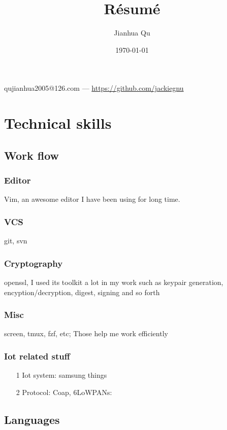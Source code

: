 \documentclass{article}
\makeatletter
\renewcommand{\maketitle}{
\begin{center}

{\huge\bfseries\theauthor}

\vspace{.25em}
qujianhua2005@126.com --- \url {https://github.com/jackiegnu}

\vspace{.25em}
\thedate

\end{center}
}
\makeatother
\begin{document}
\title {R\'esum\'e}
\author {Jianhua Qu}
\date{\today}

\maketitle

\section{Technical skills}

\subsection{Work flow}
\subsubsection{Editor}
Vim, an awesome editor I have been using for long time.

\subsubsection{VCS}
git, svn

\subsubsection{Cryptography}
openssl, I used its toolkit a lot in my work such as keypair generation,
        encyption/decryption, digest, signing and so forth

\subsubsection{Misc}
screen, tmux, fzf, etc;
Those help me work efficiently

\subsubsection{Iot related stuff}
\begin{itemize}
\item[1] Iot system: samsung things
\item[2] Protocol: Coap, 6LoWPANs:


\end{itemize}

\subsection{Languages}
\end{document}
